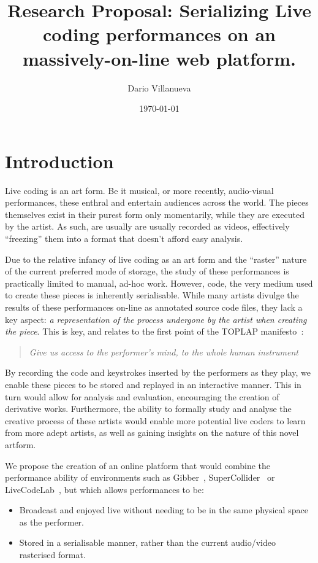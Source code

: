 \documentclass[12pt]{article}
\title{Research Proposal: Serializing Live coding performances on an massively-on-line web
platform.}
\date{\today}
\author{Dario Villanueva}
\begin{document}
\maketitle


\section{Introduction}\label{introduction}

Live coding is an art form. Be it musical, or more recently, audio-visual performances, these enthral and entertain audiences across the world. The pieces themselves exist in their purest form only momentarily, while they are executed by the artist. As such, are usually are usually recorded as videos, effectively ``freezing'' them into a format that doesn't afford easy analysis.

Due to the relative infancy of live coding as an art form and the ``raster'' nature of the current preferred mode of storage, the study of these performances is practically limited to manual, ad-hoc work. However, code, the very medium used to create these pieces is inherently serialisable. While many artists divulge the results of these performances on-line as annotated source code files, they lack a key aspect: \emph{a representation of the process undergone by the artist when creating the piece}. This is key, and relates to the first point of the TOPLAP manifesto~\cite{toplap-manifesto}:

\begin{quote}
\emph{Give us access to the performer's mind, to the whole human instrument}
\end{quote}

By recording the code and keystrokes inserted by the performers as they play, we enable these pieces to be stored and replayed in an interactive manner. This in turn would allow for analysis and evaluation, encouraging the creation of derivative works. Furthermore, the ability to formally study and analyse the creative process of these artists would enable more potential live coders to learn from more adept artists, as well as gaining insights on the nature of this novel artform.

We propose the creation of an online platform that would combine the performance ability of environments such as Gibber~\cite{gibber}, SuperCollider~\cite{supercollider} or LiveCodeLab~\cite{livecodelab}, but which allows performances to be:

\begin{itemize}
\item Broadcast and enjoyed live without needing to be in the same physical
space as the performer.
\item Stored in a serialisable manner, rather than the
current audio/video rasterised format.
\end{itemize}
\end{document}
